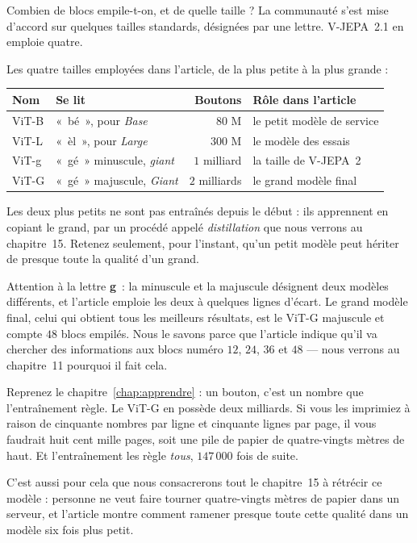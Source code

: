 Combien de blocs empile-t-on, et de quelle taille ? La communauté s'est mise
d'accord sur quelques tailles standards, désignées par une lettre. V-JEPA~2.1
en emploie quatre.

\begin{surlesdonnees}
Les quatre tailles employées dans l'article, de la plus petite à la plus
grande :

\begin{center}
\footnotesize
\begin{tabular}{llrl}
\toprule
\textbf{Nom} & \textbf{Se lit} & \textbf{Boutons} & \textbf{Rôle dans l'article} \\
\midrule
ViT-B & «~bé~», pour \emph{Base}     & $80$ M            & le petit modèle de service \\
ViT-L & «~èl~», pour \emph{Large}    & $300$ M           & le modèle des essais \\
ViT-g & «~gé~» minuscule, \emph{giant} & $1$ milliard    & la taille de V-JEPA~2 \\
ViT-G & «~gé~» majuscule, \emph{Giant} & $2$ milliards   & le grand modèle final \\
\bottomrule
\end{tabular}
\end{center}

Les deux plus petits ne sont pas entraînés depuis le début : ils apprennent
en copiant le grand, par un procédé appelé \emph{distillation} que nous
verrons au chapitre~15. Retenez seulement, pour l'instant, qu'un petit modèle
peut hériter de presque toute la qualité d'un grand.

Attention à la lettre \textbf{g}~: la minuscule et la majuscule désignent
deux modèles différents, et l'article emploie les deux à quelques lignes
d'écart. Le grand modèle final, celui qui obtient tous les meilleurs
résultats, est le ViT-G majuscule et compte $48$ blocs empilés. Nous le
savons parce que l'article indique qu'il va chercher des informations aux
blocs numéro $12$, $24$, $36$ et $48$ — nous verrons au
chapitre~11 pourquoi il fait cela.
\end{surlesdonnees}

\begin{exemple}
Reprenez le chapitre~\ref{chap:apprendre} : un bouton, c'est un nombre que
l'entraînement règle. Le ViT-G en possède deux milliards. Si vous les
imprimiez à raison de cinquante nombres par ligne et cinquante lignes par
page, il vous faudrait huit cent mille pages, soit une pile de papier de
quatre-vingts mètres de haut. Et l'entraînement les règle \emph{tous},
$147\,000$ fois de suite.

C'est aussi pour cela que nous consacrerons tout le chapitre~15 à rétrécir
ce modèle : personne ne veut faire tourner quatre-vingts mètres de papier
dans un serveur, et l'article montre comment ramener presque toute cette
qualité dans un modèle six fois plus petit.
\end{exemple}

